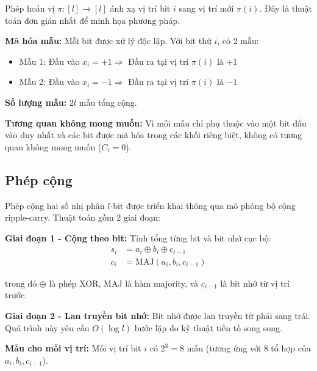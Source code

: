 Phép hoán vị $\pi: [l] \rightarrow [l]$ ánh xạ vị trí bit $i$ sang vị trí mới $\pi(i)$. Đây là thuật toán đơn giản nhất để minh họa phương pháp.

\vspace{0.2cm}

\textbf{Mã hóa mẫu:} Mỗi bit được xử lý độc lập. Với bit thứ $i$, có 2 mẫu:
\begin{itemize}
    \item Mẫu 1: Đầu vào $x_i = +1 \Rightarrow$ Đầu ra tại vị trí $\pi(i)$ là $+1$
    \item Mẫu 2: Đầu vào $x_i = -1 \Rightarrow$ Đầu ra tại vị trí $\pi(i)$ là $-1$
\end{itemize}

\textbf{Số lượng mẫu:} $2l$ mẫu tổng cộng.

\vspace{0.2cm}

\textbf{Tương quan không mong muốn:} Vì mỗi mẫu chỉ phụ thuộc vào một bit đầu vào duy nhất và các bit được mã hóa trong các khối riêng biệt, không có tương quan không mong muốn ($C_i = 0$).

\subsection{Phép cộng}

Phép cộng hai số nhị phân $l$-bit được triển khai thông qua mô phỏng bộ cộng ripple-carry. Thuật toán gồm 2 giai đoạn:

\vspace{0.2cm}

\textbf{Giai đoạn 1 - Cộng theo bit:} Tính tổng từng bit và bit nhớ cục bộ:
\begin{align}
    s_i &= a_i \oplus b_i \oplus c_{i-1} \\
    c_i &= \text{MAJ}(a_i, b_i, c_{i-1})
\end{align}

trong đó $\oplus$ là phép XOR, MAJ là hàm majority, và $c_{i-1}$ là bit nhớ từ vị trí trước.

\vspace{0.2cm}

\textbf{Giai đoạn 2 - Lan truyền bit nhớ:} Bit nhớ được lan truyền từ phải sang trái. Quá trình này yêu cầu $O(\log l)$ bước lặp do kỹ thuật tiền tố song song.

\vspace{0.2cm}

\textbf{Mẫu cho mỗi vị trí:} Mỗi vị trí bit $i$ có $2^3 = 8$ mẫu (tương ứng với 8 tổ hợp của $a_i, b_i, c_{i-1}$).

